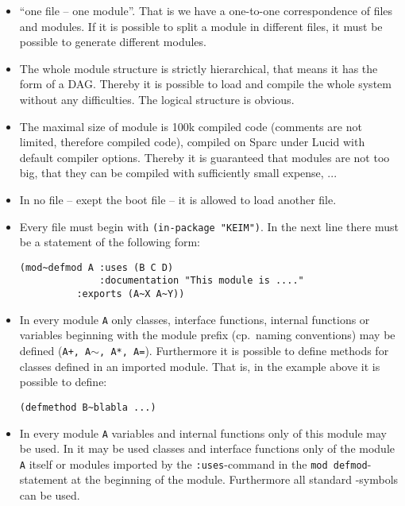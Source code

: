 \begin{itemize}
\item ``one file -- one module''. That is we have a one-to-one
correspondence of files and modules. If it is possible to split a
module in different files, it must be possible to generate different
modules.

\item The whole module structure is strictly hierarchical, that means
it has the form of a DAG. Thereby it is possible to load and compile
the whole system without any difficulties. The logical structure is
obvious.

\item The maximal size of module is 100k compiled code (comments are
not limited, therefore compiled code), compiled on Sparc under Lucid
with default compiler options. Thereby it is guaranteed that modules
are not too big, that they can be compiled with sufficiently small
expense, ...

\item In no file -- exept the boot file -- it is allowed to load
another file.

\item Every file must begin with {\tt (in-package "KEIM")}. In the
next line there must be a statement of the following form:
\begin{verbatim}
(mod~defmod A :uses (B C D)
              :documentation "This module is ...."
	      :exports (A~X A~Y))
\end{verbatim}

\item In every module {\tt A} only classes, interface functions,
internal functions or variables beginning with the module prefix (cp.\
naming conventions) may be defined ({\tt A+, A$\sim{}$, A*, A=}).
Furthermore it is possible to define methods for classes defined in an
imported module. That is, in the example above it is possible to
define:
\begin{verbatim}
(defmethod B~blabla ...)
\end{verbatim}

\item In every module {\tt A} variables and internal functions only of
this module may be used. In it may be used classes and interface
functions only of the module {\tt A} itself or modules imported by the
{\tt :uses}-command in the {\tt mod~defmod}-statement at the beginning
of the module.  Furthermore all standard \lisp-symbols can be used.

\end{itemize}

